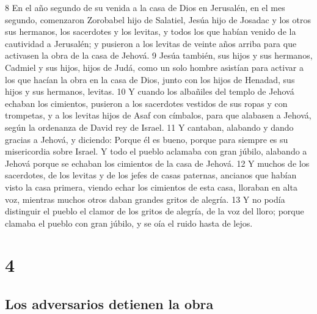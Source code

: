 8 En el año segundo de su venida a la casa de Dios en Jerusalén, en el mes segundo, comenzaron Zorobabel hijo de Salatiel, Jesúa hijo de Josadac y los otros sus hermanos, los sacerdotes y los levitas, y todos los que habían venido de la cautividad a Jerusalén; y pusieron a los levitas de veinte años arriba para que activasen la obra de la casa de Jehová.
9 Jesúa también, sus hijos y sus hermanos, Cadmiel y sus hijos, hijos de Judá, como un solo hombre asistían para activar a los que hacían la obra en la casa de Dios, junto con los hijos de Henadad, sus hijos y sus hermanos, levitas.
10 Y cuando los albañiles del templo de Jehová echaban los cimientos, pusieron a los sacerdotes vestidos de sus ropas y con trompetas, y a los levitas hijos de Asaf con címbalos, para que alabasen a Jehová, según la ordenanza de David rey de Israel. 
11 Y cantaban, alabando y dando gracias a Jehová, y diciendo: Porque él es bueno, porque para siempre es su misericordia sobre Israel. Y todo el pueblo aclamaba con gran júbilo, alabando a Jehová porque se echaban los cimientos de la casa de Jehová.
12 Y muchos de los sacerdotes, de los levitas y de los jefes de casas paternas, ancianos que habían visto la casa primera, viendo echar los cimientos de esta casa, lloraban en alta voz, mientras muchos otros daban grandes gritos de alegría.
13 Y no podía distinguir el pueblo el clamor de los gritos de alegría, de la voz del lloro; porque clamaba el pueblo con gran júbilo, y se oía el ruido hasta de lejos.

\chapter{4}

\section*{Los adversarios detienen la obra}

